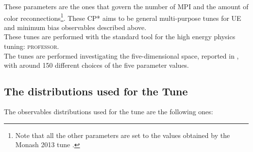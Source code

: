 \noindent These parameters are the ones that govern the number of MPI and the amount of color reconnections\footnote{Note that all the other parameters are set to the values obtained by the Monash 2013  tune \cite{Monash}.}. These CP* aims to be general multi-purpose tunes for UE and minimum bias observables described above.
\\
These tunes are performed with the standard tool for the  high energy physics tuning: \textsc{professor}. 
\\
The tunes are performed investigating the five-dimensional space, reported in , with around 150 different choices of the five parameter values.


\subsection{The distributions used for the Tune}
\label{sec:Thedistributionsused}

The observables distributions used for the tune are the following ones:


